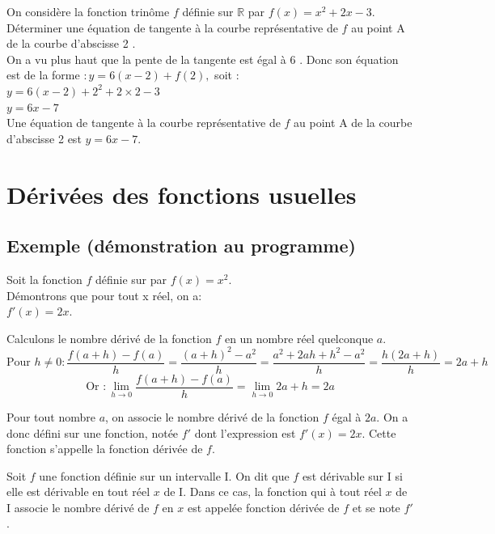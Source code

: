 \begin{bmethode}
    On considère la fonction trinôme $f$ définie sur $\mathbb{R}$ par $f(x)=x^{2}+2 x-3$.\\ Déterminer une équation de tangente à la courbe représentative de $f$ au point $\mathrm{A}$ de la courbe d'abscisse 2 .\\
    On a vu plus haut que la pente de la tangente est égal à 6 . Donc son équation est de la forme $: y=6(x-2)+f(2),$ soit :\\
    $y=6(x-2)+2^{2}+2 \times 2-3$\\
    $y=6 x-7$\\
    Une équation de tangente à la courbe représentative de $f$ au point $\mathrm{A}$ de la courbe d'abscisse 2 est $y=6 x-7$.
\end{bmethode}

\section{Dérivées des fonctions usuelles}

\subsection{Exemple (démonstration au programme)}
\begin{bdemo}
    Soit la fonction $f$ définie sur \R par $f(x)=x^2$.\\ 
    Démontrons que pour tout x réel, on a:\\
    $f'(x)=2x$.


Calculons le nombre dérivé de la fonction $f$ en un nombre réel quelconque $a$. 
\[ \text{Pour }h\neq0:\frac{f(a+h)-f(a)}{h}=\frac{(a+h)^2-a^2}{h}=\frac{a^2+2ah+h^2-a^2}{h}=\frac{h(2a+h)}{h}=2a+h\]
\[ \text{Or }:\lim\limits_{h \rightarrow 0} \frac{f(a+h)-f(a)}{h} = \lim\limits_{h \rightarrow 0} 2a+h=2a\]

Pour tout nombre $a$, on associe le nombre dérivé de la fonction $f$ égal à $2a$.
On a donc défini sur \R une fonction, notée $f'$ dont l'expression est $f'(x)=2x$.
Cette fonction s'appelle la fonction dérivée de $f$.
\end{bdemo}

\begin{bdefi}
    Soit $f$ une fonction définie sur un intervalle I.
    On dit que $f$ est dérivable sur I si elle est dérivable en tout réel $x$ de I.
    Dans ce cas, la fonction qui à tout réel $x$ de I associe le nombre dérivé de $f$ en $x$ est appelée fonction dérivée de $f$ et se note $f'$.
\end{bdefi}

